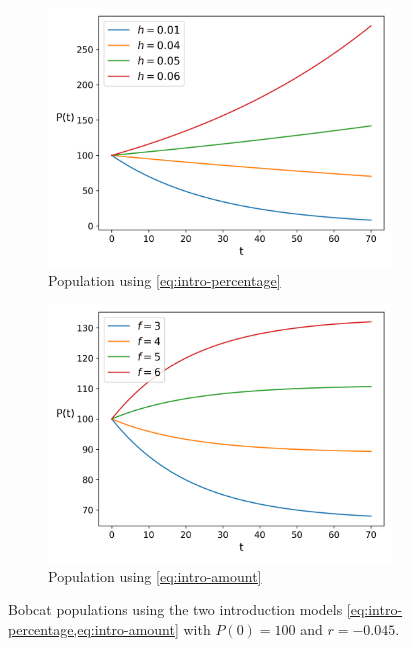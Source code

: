 \documentclass{article}
\begin{document}
\begin{figure}[h]
    \centering
    \begin{subfigure}{.5\textwidth}
        \centering
        \includegraphics[width=.95\linewidth]{./introduction/percentage_long_term.png}
        \caption{Population using \cref{eq:intro-percentage}}
        \label{fig:intro-percentage}
    \end{subfigure}%
    \begin{subfigure}{.5\textwidth}
        \centering
        \includegraphics[width=.95\linewidth]{./introduction/amount_long_term.png}
        \caption{Population using \cref{eq:intro-amount}}
        \label{fig:intro-amount}
    \end{subfigure}
    \caption{Bobcat populations using the two introduction models \cref{eq:intro-percentage,eq:intro-amount} with $P(0) = 100$ and $r = -0.045$.}
    \label{fig:6}
\end{figure}
\end{document}
